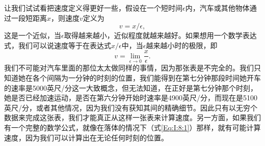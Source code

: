 \documentclass[12pt,oneside]{book}
\begin{document}
让我们试试看把速度定义得更好一些，假设在一个短时间$\epsilon$内，汽车或其他物体通过一段短距离$x$，则速度$v$定义为
\begin{equation*}
v=x/\epsilon,
\end{equation*}
这是一个近似，当$\epsilon$取得越来越小，近似程度就越来越好。如果想用一个数学表达式，我们可以说速度等于在表达式$x/\epsilon$中，当$\epsilon$越来越小时的极限，即
\begin{equation}
\label{Eq:I:8:3}
v=\lim_{\epsilon\to0}\frac{x}{\epsilon}.
\end{equation}
我们不可能对汽车里面的那位太太做同样的事情，因为那张表是不完全的。我们只知道她在各个间隔为一分钟的时刻的位置，我们能得到在第七分钟那段时间她开车的速率是5000英尺/分这一大致概念，但无法知道，在正好是第七分钟那个时刻，她是否已经加速运动，是否在第六分钟开始时速率是4900英尺/分，而现在是5100英尺/分，或者其他情况，因为我们没有获知其间的精确细节。因此只有以无穷个数据来完成这张表，我们才能真正从这样一张表来计算速度。另一方面，如果我们有一个完整的数学公式，就像在落体的情况下（式\ref{Eq:I:8:1}）那样，就有可能计算速度，因为我们可以计算出在无论任何时刻的位置。
\end{document}

